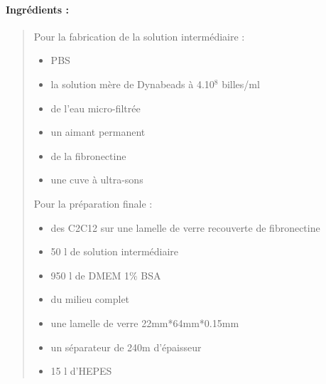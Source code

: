 	\paragraph{Ingrédients : }
	\begin{quote}
	Pour la fabrication de la solution intermédiaire : 
	\begin{itemize}
	\item PBS
	\item la solution mère de Dynabeads à 4.10$^{8}$ billes/ml
	\item de l'eau micro-filtrée 
	\item un aimant permanent
	\item de la fibronectine
	\item une cuve à ultra-sons
	\end{itemize}
	Pour la préparation finale : 
	\begin{itemize}
	\item des C2C12 sur une lamelle de verre recouverte de fibronectine
	\item 50 \micro l de solution intermédiaire
	\item 950 \micro l de DMEM 1\% BSA
	\item du milieu complet
	\item une lamelle de verre 22mm*64mm*0.15mm
	\item un séparateur de 240\micro m d'épaisseur
	\item 15 \micro l d'HEPES
	\end{itemize}
	\end{quote}
	
